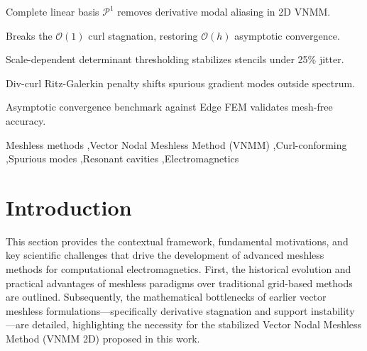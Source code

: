 \documentclass[preprint,12pt]{elsarticle}
\begin{document}
\begin{frontmatter}
\begin{graphicalabstract}
\end{graphicalabstract}

\begin{highlights}
\item Complete linear basis $\mathcal{P}^1$ removes derivative modal aliasing in 2D VNMM.
\item Breaks the $\mathcal{O}(1)$ curl stagnation, restoring $\mathcal{O}(h)$ asymptotic convergence.
\item Scale-dependent determinant thresholding stabilizes stencils under 25\% jitter.
\item Div-curl Ritz-Galerkin penalty shifts spurious gradient modes outside spectrum.
\item Asymptotic convergence benchmark against Edge FEM validates mesh-free accuracy.
\end{highlights}

\begin{keyword}
Meshless methods \sep Vector Nodal Meshless Method (VNMM) \sep Curl-conforming \sep Spurious modes \sep Resonant cavities \sep Electromagnetics


\end{keyword}

\end{frontmatter}


\section{Introduction}
\label{sec:intro}

This section provides the contextual framework, fundamental motivations, and key scientific challenges that drive the development of advanced meshless methods for computational electromagnetics. First, the historical evolution and practical advantages of meshless paradigms over traditional grid-based methods are outlined. Subsequently, the mathematical bottlenecks of earlier vector meshless formulations---specifically derivative stagnation and support instability---are detailed, highlighting the necessity for the stabilized Vector Nodal Meshless Method (VNMM 2D) proposed in this work.
\end{document}
